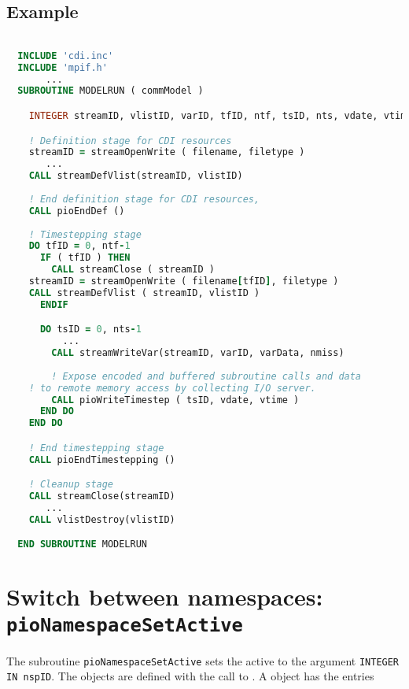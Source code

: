 \subsection*{Example}
\begin{lstlisting}[language=Fortran, backgroundcolor=\color{zebg}, 
basicstyle=\footnotesize, label=model]

  INCLUDE 'cdi.inc'
  INCLUDE 'mpif.h'
       ...
  SUBROUTINE MODELRUN ( commModel )

    INTEGER streamID, vlistID, varID, tfID, ntf, tsID, nts, vdate, vtime

    ! Definition stage for CDI resources
    streamID = streamOpenWrite ( filename, filetype )
       ...
    CALL streamDefVlist(streamID, vlistID)
    
    ! End definition stage for CDI resources,
    CALL pioEndDef ()
 
    ! Timestepping stage
    DO tfID = 0, ntf-1
      IF ( tfID ) THEN
        CALL streamClose ( streamID )
	streamID = streamOpenWrite ( filename[tfID], filetype )
	CALL streamDefVlist ( streamID, vlistID )
      ENDIF 

      DO tsID = 0, nts-1
          ...
        CALL streamWriteVar(streamID, varID, varData, nmiss)
      
        ! Expose encoded and buffered subroutine calls and data 
	! to remote memory access by collecting I/O server.
        CALL pioWriteTimestep ( tsID, vdate, vtime )
      END DO
    END DO

    ! End timestepping stage
    CALL pioEndTimestepping ()

    ! Cleanup stage
    CALL streamClose(streamID)
       ...
    CALL vlistDestroy(vlistID)

  END SUBROUTINE MODELRUN

\end{lstlisting}

\section{Switch between namespaces: {\tt pioNamespaceSetActive}}
\label{pioNamespaceSetActive}
The subroutine {\tt pioNamespaceSetActive} sets the active 
{} to 
the argument {\tt INTEGER IN nspID}.
The {} objects are defined with the call to 
{}. A {} 
object has the entries
\smallskip

